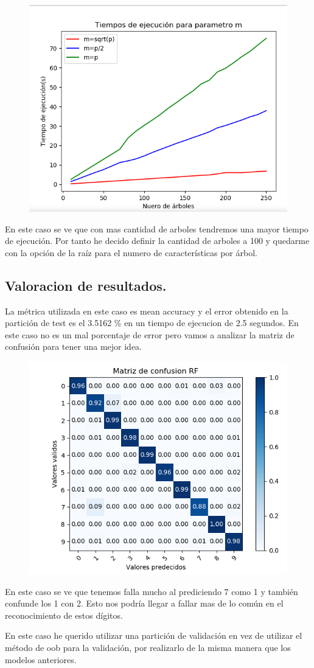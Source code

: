 \documentclass[titlepage]{article}
\begin{document}
	\begin{figure}[H]
		\centering
		\includegraphics[width=0.7\linewidth]{../imagenesRF/tiempoEjecucion}
		\caption{}
		\label{fig:Tiempo de ejecucion}
	\end{figure}

	En este caso se ve que con mas cantidad de arboles tendremos una mayor tiempo de ejecución. Por tanto he decido definir la cantidad de arboles a 100 y quedarme con la opción de la raíz para el numero de características por árbol.
	
	
	\subsection{Valoracion de resultados.}
	La métrica utilizada en este caso es mean accuracy y el error obtenido en la partición de test es el 3.5162 \% en un tiempo de ejecucion de 2.5 segundos. En este caso no es un mal porcentaje de error pero vamos a analizar la matriz de confusión para tener una mejor idea.
	
	\begin{figure}[H]
		\centering
		\includegraphics[width=0.7\linewidth]{../imagenesRF/matrizConfusion}
		\caption{}
		\label{fig:Matriz de confusion RF}
	\end{figure}
	
	En este caso se ve que tenemos falla mucho al prediciendo 7 como 1 y también confunde los 1 con 2. Esto nos podría llegar a fallar mas de lo común en el reconocimiento de estos dígitos.
	
	En este caso he querido utilizar una partición de validación en vez de utilizar el método de oob para la validación, por realizarlo de la misma manera que los modelos anteriores.
	
	
\end{document}
